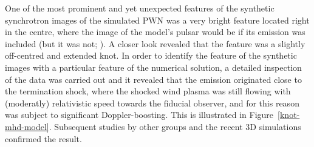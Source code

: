 One of the most prominent and yet unexpected features of the synthetic synchrotron images of the simulated PWN was a very bright feature located right in the centre, where the image of the model’s pulsar would be if its emission was included (but it was not; \citet{ssk-lyub-03,ssk-lyub-04}).  A closer look revealed that the feature was a slightly off-centred and extended knot.  In order to identify the feature of the synthetic images with a particular feature of the numerical solution,  a detailed inspection of the data was carried out and it revealed that the emission originated close to the termination shock, where the shocked wind plasma was still flowing with  (moderatly) relativistic speed towards the fiducial observer,  and for this reason was subject to significant Doppler-boosting.  This is illustrated in Figure~\ref{knot-mhd-model}. Subsequent  studies by other groups \cite{delzanna-06} and  the recent 3D simulations \citep{porth-13,porth-14} confirmed the result.    